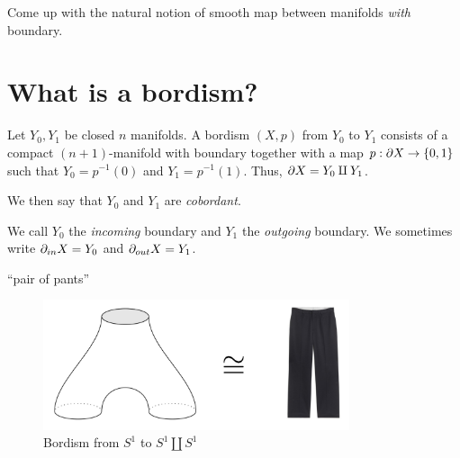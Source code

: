 \begin{exercise}
    Come up with the natural notion of smooth map between manifolds \emph{with} boundary. 
\end{exercise}

\section{What is a bordism?}

\begin{defn}
\label{Define Bordism}
    Let $Y_0, Y_1$ be closed $n$ manifolds. A bordism $(X,p)$ from $Y_0$ to $Y_1$ consists of a compact $(n+1)$-manifold with boundary together with a map $p: \partial X \to \{0,1\}$ such that $Y_0 = p^{-1}(0)$ and $Y_1 = p^{-1}(1)$. Thus, $\partial X = Y_0 \amalg Y_1$.

    \noindent We then say that $Y_0$ and $Y_1$ are \textit{cobordant}.
\end{defn}
\noindent We call $Y_0$ the \textit{incoming} boundary and $Y_1$ the \textit{outgoing} boundary. We sometimes write $\partial_{in} X = Y_0$ and $\partial_{out} X = Y_1$.

\begin{ex}
    ``pair of pants'' %
    \begin{figure}[!ht]
        \centering
        \captionsetup{labelformat=empty, format = hang}
        \begin{measuredfigure}
            \includegraphics[width=9cm]{images/Lecture 2/pants_topological.png} 
            \caption{\small{Bordism from $S^1$ to $S^1\amalg S^1$}}
        \end{measuredfigure}
    \end{figure}
\end{ex}

